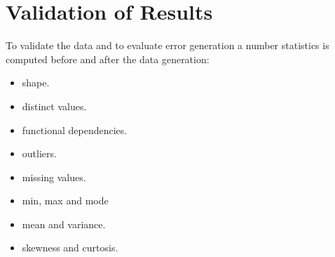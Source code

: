 \section{Validation of Results}
\label{sec:validation}


To validate the data and to evaluate error generation a number statistics is computed before and after the data generation:
\begin{itemize}
    \item shape. 
    \item distinct values.
    \item functional dependencies.
    \item outliers.
    \item missing values.
    \item min, max and mode
    \item mean and variance.
    \item skewness and curtosis.
\end{itemize}

